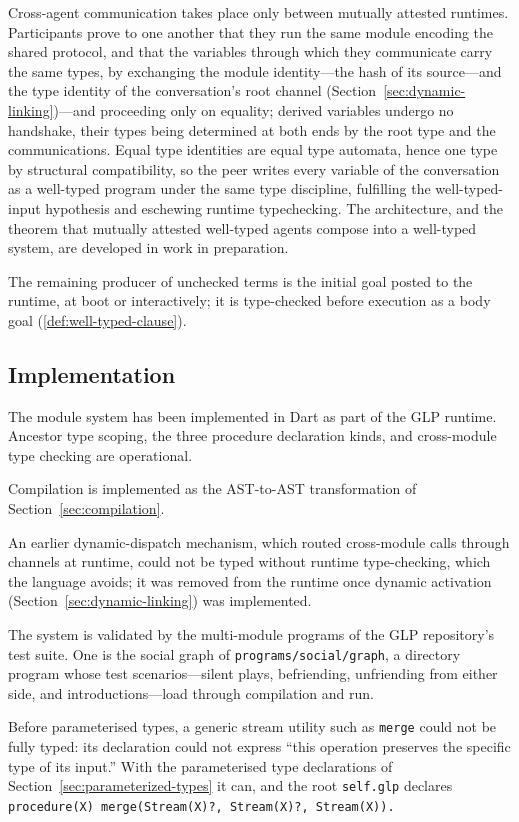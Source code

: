 Cross-agent communication takes place only between mutually attested runtimes.  Participants prove to one another that they run the same module encoding the shared protocol, and that the variables through which they communicate carry the same types, by exchanging the module identity---the hash of its source---and the type identity of the conversation's root channel (Section~\ref{sec:dynamic-linking})---and proceeding only on equality; derived variables undergo no handshake, their types being determined at both ends by the root type and the communications.  Equal type identities are equal type automata, hence one type by structural compatibility, so the peer writes every variable of the conversation as a well-typed program under the same type discipline, fulfilling the well-typed-input hypothesis and eschewing runtime typechecking.  The architecture, and the theorem that mutually attested well-typed agents compose into a well-typed system, are developed in work in preparation.

The remaining producer of unchecked terms is the initial goal posted to the runtime, at boot or interactively; it is type-checked before execution as a body goal (\cref{def:well-typed-clause}).

\subsection{Implementation}
\label{sec:mod-implementation}

The module system has been implemented in Dart as part of the GLP runtime.  Ancestor type scoping, the three procedure declaration kinds, and cross-module type checking are operational.

Compilation is implemented as the AST-to-AST transformation of Section~\ref{sec:compilation}.

An earlier dynamic-dispatch mechanism, which routed cross-module calls through channels at runtime, could not be typed without runtime type-checking, which the language avoids; it was removed from the runtime once dynamic activation (Section~\ref{sec:dynamic-linking}) was implemented.

The system is validated by the multi-module programs of the GLP repository's test suite.  One is the social graph of \verb|programs/social/graph|, a directory program whose test scenarios---silent plays, befriending, unfriending from either side, and introductions---load through compilation and run.

Before parameterised types, a generic stream utility such as \verb|merge| could not be fully typed: its declaration could not express ``this operation preserves the specific type of its input.''  With the parameterised type declarations of Section~\ref{sec:parameterized-types} it can, and the root \verb|self.glp| declares \verb|procedure(X) merge(Stream(X)?, Stream(X)?, Stream(X)).|
